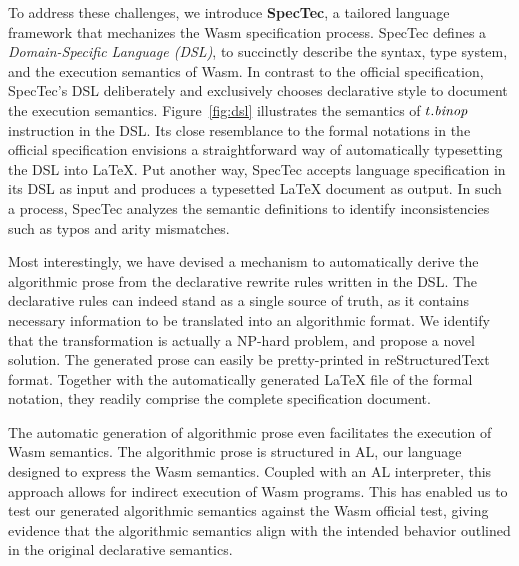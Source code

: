 To address these challenges, we introduce \textbf{SpecTec}, a tailored language framework that mechanizes the Wasm specification process. SpecTec defines
a \emph{Domain-Specific Language (DSL)}, to succinctly describe the syntax, type system, and the execution semantics of Wasm. In contrast to the official specification, SpecTec’s DSL deliberately and exclusively chooses declarative style to document the execution semantics. Figure~\ref{fig:dsl} illustrates the semantics of $t.\mbox{\emph{binop}}$ instruction in the DSL. Its close resemblance to the formal notations in the official specification envisions a straightforward way of automatically typesetting the DSL into LaTeX. Put another way, SpecTec accepts language specification in its DSL as input and produces a typesetted LaTeX document as output. In such a process, SpecTec analyzes the semantic definitions to identify inconsistencies such as typos and arity mismatches.

Most interestingly, we have devised a mechanism to automatically derive the algorithmic prose from the declarative rewrite rules written in the DSL. The declarative rules can indeed stand as a single source of truth, as it contains necessary information to be translated into an algorithmic format. We identify that the transformation is actually a NP-hard problem, and propose a novel solution. The generated prose can easily be pretty-printed in reStructuredText format. Together with the automatically generated LaTeX file of the formal notation, they readily comprise the complete specification document.

The automatic generation of algorithmic prose even facilitates the execution of Wasm semantics. The algorithmic prose is structured in AL, our language designed to express the Wasm semantics. Coupled with an AL interpreter, this approach allows for indirect execution of Wasm programs. This has enabled us to test our generated algorithmic semantics against the Wasm official test, giving evidence that the algorithmic semantics align with the intended behavior outlined in the original declarative semantics.

